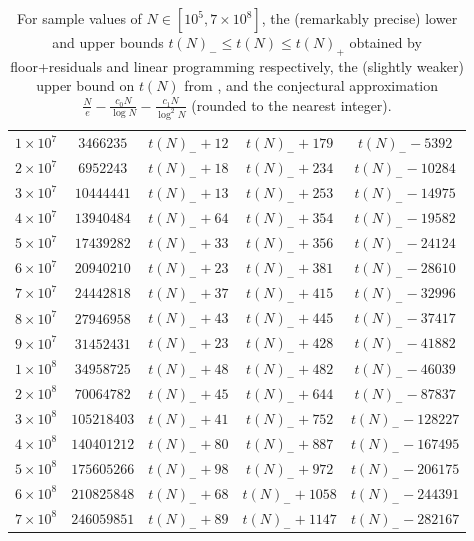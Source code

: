 \documentclass[12pt,a4paper,reqno]{amsart}
\numberwithin{equation}{section}
\theoremstyle{plain}
\theoremstyle{definition}
\begin{document}
\begin{table}[ht]
\begin{tabular}{|c|c|c|c|c|}
\hline
$1 \times 10^7$ & $\num{3466235}$ & $t(N)_- + 12$ & $t(N)_- + 179$ & $t(N)_- - \num{5392}$ \\
$2 \times 10^7$ & $\num{6952243}$ & $t(N)_- + 18$ & $t(N)_- + 234$ & $t(N)_- - \num{10284}$ \\
$3 \times 10^7$ & $\num{10444441}$ & $t(N)_- + 13$ & $t(N)_- + 253$ & $t(N)_- - \num{14975}$ \\
$4 \times 10^7$ & $\num{13940484}$ & $t(N)_- + 64$ & $t(N)_- + 354$ & $t(N)_- - \num{19582}$ \\
$5 \times 10^7$ & $\num{17439282}$ & $t(N)_- + 33$ & $t(N)_- + 356$ & $t(N)_- - \num{24124}$ \\
$6 \times 10^7$ & $\num{20940210}$ & $t(N)_- + 23$ & $t(N)_- + 381$ & $t(N)_- - \num{28610}$ \\
$7 \times 10^7$ & $\num{24442818}$ & $t(N)_- + 37$ & $t(N)_- + 415$ & $t(N)_- - \num{32996}$ \\
$8 \times 10^7$ & $\num{27946958}$ & $t(N)_- + 43$ & $t(N)_- + 445$ & $t(N)_- - \num{37417}$ \\
$9 \times 10^7$ & $\num{31452431}$ & $t(N)_- + 23$ & $t(N)_- + 428$ & $t(N)_- - \num{41882}$ \\
\hline
$1 \times 10^8$ & $\num{34958725}$ & $t(N)_- + 48$ & $t(N)_- + 482$ & $t(N)_- - \num{46039}$ \\
$2 \times 10^8$ & $\num{70064782}$ & $t(N)_- + 45$ & $t(N)_- + 644$ & $t(N)_- - \num{87837}$ \\
$3 \times 10^8$ & $\num{105218403}$ & $t(N)_- + 41$ & $t(N)_- + 752$ & $t(N)_- - \num{128227}$ \\
$4 \times 10^8$ & $\num{140401212}$ & $t(N)_- + 80$ & $t(N)_- + 887$ & $t(N)_- - \num{167495}$ \\
$5 \times 10^8$ & $\num{175605266}$ & $t(N)_- + 98$ & $t(N)_- + 972$ & $t(N)_- - \num{206175}$ \\
$6 \times 10^8$ & $\num{210825848}$ & $t(N)_- + 68$ & $t(N)_- + 1058$ & $t(N)_- - \num{244391}$ \\
$7 \times 10^8$ & $\num{246059851}$ & $t(N)_- + 89$ & $t(N)_- + 1147$ & $t(N)_- - \num{282167}$ \\
      \hline
\end{tabular}
\caption{For sample values of $N \in [10^5, 7 \times 10^8]$, the (remarkably precise) lower and upper bounds $t(N)_- \leq t(N) \leq t(N)_+$ obtained by floor+residuals and linear programming respectively, the (slightly weaker) upper bound on $t(N)$ from , and the conjectural approximation $\frac{N}{e} - \frac{c_0 N}{\log N} - \frac{c_1N}{\log^2 N}$ (rounded to the nearest integer). }\label{long-table}
\end{table}
\end{document}
